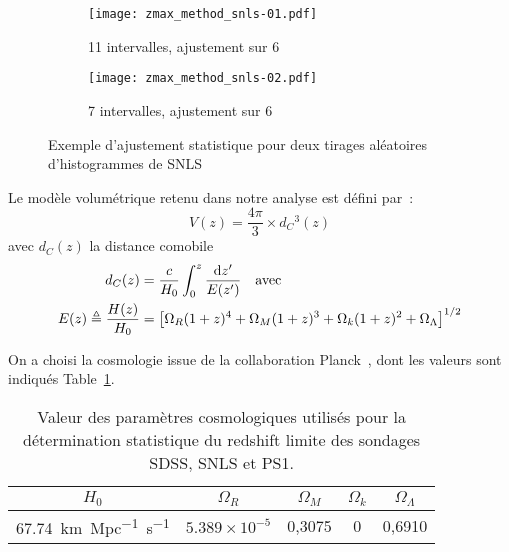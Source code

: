 \documentclass[../main/main.tex]{subfiles}
\begin{document}
\begin{figure}[ht]
    \centering
    \begin{subfigure}[]{.49\linewidth}
        \centering
        \texttt{[image: zmax\_method\_snls-01.pdf]}
        \captionsetup{justification=centering}
        \caption{11 intervalles, ajustement sur 6}
        \label{fig:zmax_method1}
    \end{subfigure}
    \begin{subfigure}[]{.49\linewidth}
        \centering
        \texttt{[image: zmax\_method\_snls-02.pdf]}
        \captionsetup{justification=centering}
        \caption{7 intervalles, ajustement sur 6}
        \label{fig:zmax_method2}
    \end{subfigure}
    \captionsetup{justification=centering}
    \caption{Exemple d'ajustement statistique pour deux tirages aléatoires
    d'histogrammes de SNLS}
    \label{fig:zmax_method}
\end{figure}


Le modèle volumétrique retenu dans notre analyse est défini par~:
\begin{equation}\label{eq:comobvol}
    V(z) = \frac{4\pi}{3}\times d_C{}^3(z)
\end{equation}
avec $d_C(z)$ la distance comobile
\begin{align}
    d_C(z)                           & =
    \frac{c}{H_0} \int_{0}^{z} \frac{\mathrm{d} z'}{E(z')}
    \quad\text{avec}\quad\\
    E(z) \triangleq \frac{H(z)}{H_0} & =
    \left[\Omega_R(1+z)^4 + \Omega_M(1+z)^3 +
        \Omega_k(1+z)^2 + \Omega_\Lambda
    \right]^{1/2}
\end{align}

On a choisi la cosmologie issue de la collaboration Planck~\citep{planck2018},
dont les valeurs sont indiqués Table~\ref{tab:planckvals}.

\begin{table}[ht]
    \centering
    \caption{Valeur des paramètres cosmologiques utilisés pour la détermination
    statistique du redshift limite des sondages SDSS, SNLS et PS1.}
    \label{tab:planckvals}
    \begin{tabular}{ccccc}
        \toprule
        $H_0$ &
        $\Omega_R$ & $\Omega_M$ & $\Omega_k$ & $\Omega_\Lambda$ \\
        \midrule
        \SI{67,74}{km.Mpc^{-1}.s^{-1}} &
        $5.389\times10^{-5}$ & 0,3075 & 0 & 0,6910 \\ 
        \bottomrule
    \end{tabular}
\end{table}
\end{document}
